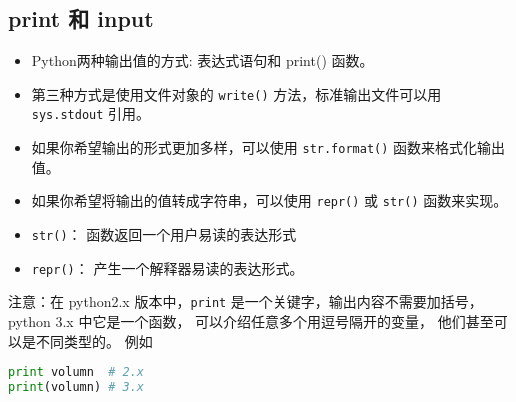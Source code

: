 
\begin{issues}
\issueTODO
\issueDraft
\end{issues}


\subsection{print 和 input}

\begin{itemize}
\item Python两种输出值的方式: 表达式语句和 print() 函数。
\item 第三种方式是使用文件对象的 \verb`write()` 方法，标准输出文件可以用 \verb`sys.stdout` 引用。
\item 如果你希望输出的形式更加多样，可以使用 \verb`str.format()` 函数来格式化输出值。
\item 如果你希望将输出的值转成字符串，可以使用 \verb`repr()` 或 \verb`str()` 函数来实现。
\end{itemize}

\begin{itemize}
\item \verb`str()`： 函数返回一个用户易读的表达形式
\item \verb`repr()`： 产生一个解释器易读的表达形式。
\end{itemize}

注意：在 python2.x 版本中，\verb`print` 是一个关键字，输出内容不需要加括号， python 3.x 中它是一个函数， 可以介绍任意多个用逗号隔开的变量， 他们甚至可以是不同类型的。 例如
\begin{lstlisting}[language=python]
print volumn  # 2.x
print(volumn) # 3.x
\end{lstlisting}
